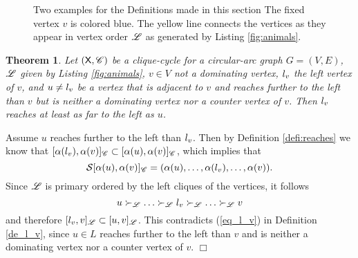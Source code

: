 \documentclass[10pt]{article}
\newtheorem{theorem}{Theorem}[section]
\newenvironment{proof}{\noindent{\bf Proof~}}{\null\hfill $\Box$\par\medskip}
\newcommand{\cordered}{\fu{S}}\newcommand{\lvi}[2]{\lv{}^{#2}(#1)}\newcommand{\rvi}[2]{\rv{}^{#2}(#1)}\newcommand{\lvd}[1]{\fu{L}_v(#1)}\newcommand{\rvd}[1]{\fu{R}_v(#1)}
\begin{document}
\begin{figure}
\centering
{}\quad
\vspace{-5pt}\caption[An example for the vertex partition defined in Section \ref{furtherDefs}]{Two examples for the Definitions made in this section
The fixed vertex $v$ is colored blue. 
The yellow line connects the vertices as they appear in vertex order $\mathscr{L}$ as generated by Listing \ref{fig:animals}.
}
\label{fig:anotherExamplefurtherDefs}
\end{figure}




\begin{theorem}\label{no_vertex_further_than_lv}
Let $(\mathsf{X},\mathscr{C})$ be a clique-cycle for a circular-arc graph $G=(V,E)$, $\mathscr{L}$ 
given by Listing \ref{fig:animals}, $v\in V$ not a dominating vertex, $l_{v}$ the left 
vertex of $v$, and $u\neq l_{v}$ be a vertex that is adjacent to $v$ and reaches further to the left than $v$ but is neither 
a dominating vertex nor a counter vertex of $v$. 
Then $l_{v}$ reaches at least as far to the left as $u$.
\end{theorem}



\begin{proof}
Assume $u$ reaches further to the left than $l_{v}$.
Then by Definition \ref{defi:reaches} we know that 
$[\alpha(l_{v}),\alpha(v)]_{\mathscr{C}}\subset[\alpha(u),\alpha(v)]_{\mathscr{C}}$, which implies 
that $$\cordered[\lc{u},\lc{v}]_\ri{C}=(\lc{u},\ldots,\lc{\lvv},\ldots,\lc{v}).$$
Since $\mathscr{L}$ is primary ordered by the left cliques of the vertices, it follows 
$$u\succ_{\mathscr{L}}\ldots\succ_{\mathscr{L}} l_{v}\succ_{\mathscr{L}}\ldots\succ_{\mathscr{L}}v$$ and therefore 
$[l_{v},v]_{\mathscr{L}}\subset[u,v]_{\mathscr{L}}$.
This contradicts (\ref{eq_l_v}) in Definition \ref{de_l_v}, since $u\in L$ reaches 
further to the left than $v$ and is neither a 
dominating vertex nor a counter vertex of $v$.
\end{proof}
\end{document}
